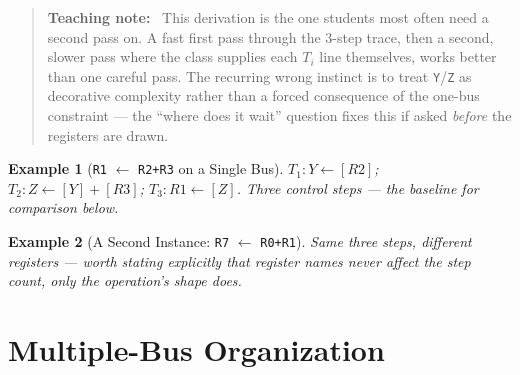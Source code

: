 \documentclass[11pt]{article}
\newtheorem{example}{Example}[section]
\newenvironment{teachingaside}{\begin{quote}\small\color{primary-gold}\textbf{Teaching note:}\ }{\end{quote}}
\begin{document}
\begin{teachingaside}
This derivation is the one students most often need a second pass on. A fast first pass through the 3-step trace, then a second, slower pass where the class supplies each $T_i$ line themselves, works better than one careful pass. The recurring wrong instinct is to treat \texttt{Y}/\texttt{Z} as decorative complexity rather than a forced consequence of the one-bus constraint --- the ``where does it wait'' question fixes this if asked \emph{before} the registers are drawn.
\end{teachingaside}

\begin{example}[\texttt{R1} $\gets$ \texttt{R2+R3} on a Single Bus]
$T_1: Y \gets [R2]$; \quad $T_2: Z \gets [Y]+[R3]$; \quad $T_3: R1 \gets [Z]$. Three control steps --- the baseline for comparison below.
\end{example}

\begin{example}[A Second Instance: \texttt{R7} $\gets$ \texttt{R0+R1}]
Same three steps, different registers --- worth stating explicitly that register \emph{names} never affect the step count, only the operation's shape does.
\end{example}

\section{Multiple-Bus Organization}
\end{document}
